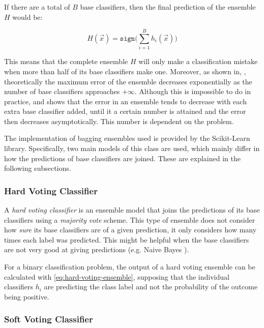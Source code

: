 \documentclass[epsfig,a4paper,11pt,titlepage,twoside,openany]{book}
\begin{document}
If there are a total of $B$ base classifiers, then the final prediction of the ensemble $H$ would be:

\begin{equation}
    H(\vec{x}) = \texttt{sign} \Big( \sum_{i=1}^B h_i (\vec{x}) \Big)
    \label{eq:hard-voting-ensemble}
\end{equation}

This means that the complete ensemble $H$ will only make a classification mistake when more than half of its base classifiers make one. Moreover, as shown in, \cite{zhou2012ensemble}, theoretically the maximum error of the ensemble decreases exponentially as the number of base classifiers approaches $+\infty$. Although this is impossible to do in practice, and \cite{zhou2012ensemble} shows that the error in an ensemble tends to decrease with each extra base classifier added, until it a certain number is attained and the error then decreases asymptotically. This number is dependent on the problem.

The implementation of bagging ensembles used is provided by the Scikit-Learn \cite{scikit-learn} library. Specifically, two main models of this class are used, which mainly differ in how the predictions of base classifiers are joined. These are explained in the following subsections. 


\subsubsection{Hard Voting Classifier}
\label{sec:hard-voting-classifier}

A \textit{hard voting classifier} is an ensemble model that joins the predictions of its base classifiers using a \textit{majority vote} scheme. This type of ensemble does not consider how \textit{sure} its base classifiers are of a given prediction, it only considers how many times each label was predicted. This might be helpful when the base classifiers are not very good at giving predictions (e.g. Naive Bayes \cite{Domingos1997,scikit-learn}).

For a binary classification problem, the output of a hard voting ensemble can be calculated with \autoref{eq:hard-voting-ensemble}, supposing that the individual classifiers $h_i$ are predicting the class label and not the probability of the outcome being positive.


\subsubsection{Soft Voting Classifier}
\label{sec:soft-voting-classifier}
\end{document}
